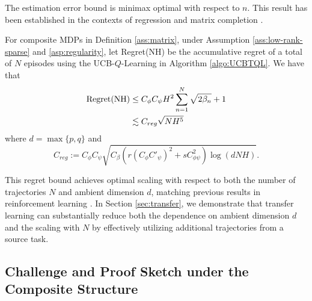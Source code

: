 \begin{remark}
The estimation error bound is minimax optimal with respect to $n$. This result has been established in the contexts of regression and matrix completion \cite{chai2024structured}.
\end{remark}

\begin{theorem}\label{thm:single-task-regret}
For composite MDPs in Definition \ref{ass:matrix}, under Assumption \ref{ass:low-rank-sparse} and \ref{asp:regularity}, let {\rm Regret(NH)}  be the accumulative regret of a total of $N$ episodes using the UCB-$Q$-Learning in Algorithm \ref{algo:UCBTQL}. 
We have that
\begin{align*}
{\rm Regret(NH)} 
&\le C_{\phi}C_{\psi}H^2\sum_{n=1}^N\sqrt{2\beta_n}+1\\
&\lesssim C_{reg}\sqrt{NH^5}
\end{align*}
where $d=\max\{p, q\}$ and
$$C_{reg}:=C_\phi C_\psi \sqrt{C_\beta\left(r(C_\phi C'_{\psi})^2 +sC_{\phi\psi}^2\right)\log(dNH)}.$$
\end{theorem}

\begin{remark}
This regret bound achieves optimal scaling with respect to both the number of trajectories $N$ and ambient dimension $d$, matching previous results in reinforcement learning \cite{yang2020reinforcement,jin2020provably}. In Section \ref{sec:transfer}, we demonstrate that transfer learning can substantially reduce both the dependence on ambient dimension $d$ and the scaling with $N$ by effectively utilizing additional trajectories from a source task.
\end{remark}


\subsection{Challenge and Proof Sketch under the Composite Structure} \label{sec:challenge-single}

